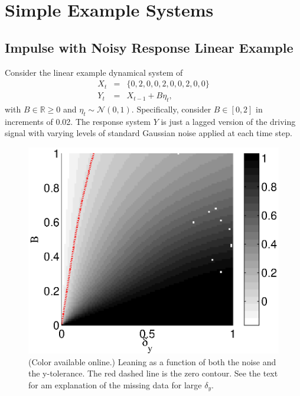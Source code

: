 \documentclass[a4paper,11pt,twocolumn]{article}
\begin{document}
\section{Simple Example Systems}

\subsection{Impulse with Noisy Response Linear Example}
Consider the linear example dynamical system of
\begin{eqnarray}
\label{eq:linearex1}
X_t &=& \{0,2,0,0,2,0,0,2,0,0\}\\
Y_t &=& X_{t-1}+B\eta_t,
\end{eqnarray}
with $B\in\mathbb{R}\ge 0$ and $\eta_t\sim\mathcal{N}\left(0,1\right)$.  Specifically, consider $B\in[0,2]$ in increments of 0.02.  The response system $Y$ is just a lagged version of the driving signal with varying levels of standard Gaussian noise applied at each time step.  
\begin{figure}[ht]
\includegraphics[scale=0.65]{SimpleIRexample_plot.eps}
\caption{(Color available online.) Leaning as a function of both the noise and the y-tolerance.  The red dashed line is the zero contour.  See the text for am explanation of the missing data for large $\delta_y$.}
\end{figure}
\end{document}
